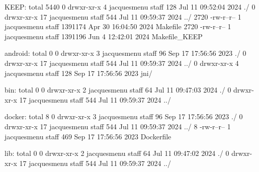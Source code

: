 KEEP:
total 5440
   0 drwxr-xr-x   4 jacquesmenu  staff      128 Jul 11 09:52:04 2024 ./
   0 drwxr-xr-x  17 jacquesmenu  staff      544 Jul 11 09:59:37 2024 ../
2720 -rw-r--r--   1 jacquesmenu  staff  1391174 Apr 30 16:04:50 2024 Makefile
2720 -rw-r--r--   1 jacquesmenu  staff  1391196 Jun  4 12:42:01 2024 Makefile_KEEP

android:
total 0
0 drwxr-xr-x   3 jacquesmenu  staff   96 Sep 17 17:56:56 2023 ./
0 drwxr-xr-x  17 jacquesmenu  staff  544 Jul 11 09:59:37 2024 ../
0 drwxr-xr-x   4 jacquesmenu  staff  128 Sep 17 17:56:56 2023 jni/

bin:
total 0
0 drwxr-xr-x   2 jacquesmenu  staff   64 Jul 11 09:47:03 2024 ./
0 drwxr-xr-x  17 jacquesmenu  staff  544 Jul 11 09:59:37 2024 ../

docker:
total 8
0 drwxr-xr-x   3 jacquesmenu  staff   96 Sep 17 17:56:56 2023 ./
0 drwxr-xr-x  17 jacquesmenu  staff  544 Jul 11 09:59:37 2024 ../
8 -rw-r--r--   1 jacquesmenu  staff  469 Sep 17 17:56:56 2023 Dockerfile

lib:
total 0
0 drwxr-xr-x   2 jacquesmenu  staff   64 Jul 11 09:47:02 2024 ./
0 drwxr-xr-x  17 jacquesmenu  staff  544 Jul 11 09:59:37 2024 ../
